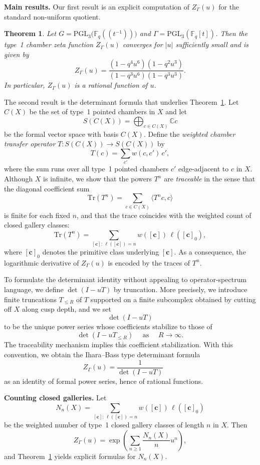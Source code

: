 \documentclass[11pt]{amsart}
\newtheorem{thm}{Theorem}[section]
\theoremstyle{definition}
\theoremstyle{remark}
\numberwithin{equation}{section}
\begin{document}
\noindent\textbf{Main results.}
Our first result is an explicit computation of $Z_\Gamma(u)$ for the standard non-uniform quotient.

\begin{thm}\label{thm:1.1}
Let $G=\mathrm{PGL}_3\bigl(\mathbb{F}_q(\!(t^{-1})\!)\bigr)$ and $\Gamma=\mathrm{PGL}_3(\mathbb{F}_q[t])$.
Then the type~1 chamber zeta function $Z_\Gamma(u)$ converges for $|u|$ sufficiently small and is given by
\[
Z_{\Gamma}(u)
=
\frac{(1-q^4u^6)(1-q^2u^3)}{(1-q^3u^6)(1-q^3u^3)}.
\]
In particular, $Z_\Gamma(u)$ is a rational function of $u$.
\end{thm}

The second result is the determinant formula that underlies Theorem~\ref{thm:1.1}.
Let $C(X)$ be the set of type~1 pointed chambers in $X$ and let
\[
S(C(X))=\bigoplus_{c\in C(X)} \mathbb{C}c
\]
be the formal vector space with basis $C(X)$.
Define the \emph{weighted chamber transfer operator} $T\colon S(C(X))\to S(C(X))$ by
\[
T(c)=\sum_{c'} w(c,c')\,c',
\]
where the sum runs over all type~1 pointed chambers $c'$ edge-adjacent to $c$ in $X$.
Although $X$ is infinite, we show that the powers $T^n$ are \emph{traceable} in the sense that the diagonal coefficient sum
\[
\mathrm{Tr}(T^n)=\sum_{c\in C(X)} \langle T^n c, c\rangle
\]
is finite for each fixed $n$, and that the trace coincides with the weighted count of closed gallery classes:
\[
\mathrm{Tr}(T^n)
=
\sum_{[\mathbf{c}]:\,\ell([\mathbf{c}])=n} w([\mathbf{c}])\,\ell([\mathbf{c}]_0),
\]
where $[\mathbf{c}]_0$ denotes the primitive class underlying $[\mathbf{c}]$.
As a consequence, the logarithmic derivative of $Z_\Gamma(u)$ is encoded by the traces of $T^n$.

To formulate the determinant identity without appealing to operator-spectrum language, we define
$\det(I-uT)$ by truncation.
More precisely, we introduce finite truncations $T_{\le R}$ of $T$ supported on a finite subcomplex obtained by cutting off $X$ along cusp depth, and we set
\[
\det(I-uT)
\]
to be the unique power series whose coefficients stabilize to those of 
\[\det(I-uT_{\le R})\quad\text{ as }\quad R\to\infty.\]
The traceability mechanism implies this coefficient stabilization.
With this convention, we obtain the Ihara--Bass type determinant formula
\[
Z_\Gamma(u)=\frac{1}{\det(I-uT)}
\qquad\]
as an identity of formal power series, hence of rational functions.

\medskip

\noindent\textbf{Counting closed galleries.}
Let
\[
N_n(X)=\sum_{[\mathbf{c}]:\,\ell([\mathbf{c}])=n} w([\mathbf{c}])\,\ell([\mathbf{c}]_0)
\]
be the weighted number of type~1 closed gallery classes of length $n$ in $X$.
Then
\[
Z_\Gamma(u)
=
\exp\left(\sum_{n\ge 1}\frac{N_n(X)}{n}u^n\right),
\]
and Theorem~\ref{thm:1.1} yields explicit formulas for $N_n(X)$.
\end{document}
